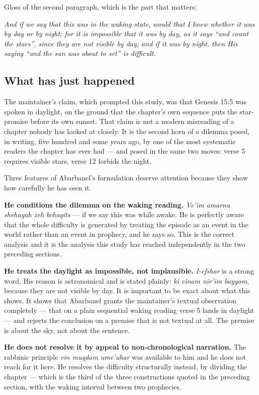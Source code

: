 \noindent Gloss of the second paragraph, which is the part that matters:

\begin{studyframe}
\emph{And if we say that this was in the waking state, would that I knew whether
it was by day or by night; for it is impossible that it was by day, as it says
``and count the stars'', since they are not visible by day; and if it was by
night, then His saying ``and the sun was about to set'' is difficult.}
\end{studyframe}

\subsection{What has just happened}

The maintainer's claim, which prompted this study, was that Genesis 15:5 was
spoken in daylight, on the ground that the chapter's own sequence puts the
star-promise before its own sunset. That claim is not a modern misreading of a
chapter nobody has looked at closely. It is the second horn of a dilemma posed,
in writing, five hundred and some years ago, by one of the most systematic
readers the chapter has ever had --- and posed in the same two moves: verse 5
requires visible stars, verse 12 forbids the night.

Three features of Abarbanel's formulation deserve attention because they show
how carefully he has seen it.

\textbf{He conditions the dilemma on the waking reading.} \textit{Ve'im amarnu
shehayah zeh behaqits} --- if we say this was while awake. He is perfectly aware
that the whole difficulty is generated by treating the episode as an event in
the world rather than an event in prophecy, and he says so. This is the correct
analysis and it is the analysis this study has reached independently in the two
preceding sections.

\textbf{He treats the daylight as impossible, not implausible.}
\textit{I-efshar} is a strong word. His reason is astronomical and is stated
plainly: \textit{ki einam nir'im bayyom}, because they are not visible by day.
It is important to be exact about what this shows. It shows that Abarbanel
grants the maintainer's textual observation completely --- that on a plain
sequential waking reading verse 5 lands in daylight --- and rejects the
conclusion on a premise that is not textual at all. The premise is about the
sky, not about the sentence.

\textbf{He does not resolve it by appeal to non-chronological narration.} The
rabbinic principle \textit{ein muqdam ume'uhar} was available to him and he does
not reach for it here. He resolves the difficulty structurally instead, by
dividing the chapter --- which is the third of the three constructions quoted in
the preceding section, with the waking interval between two prophecies.

